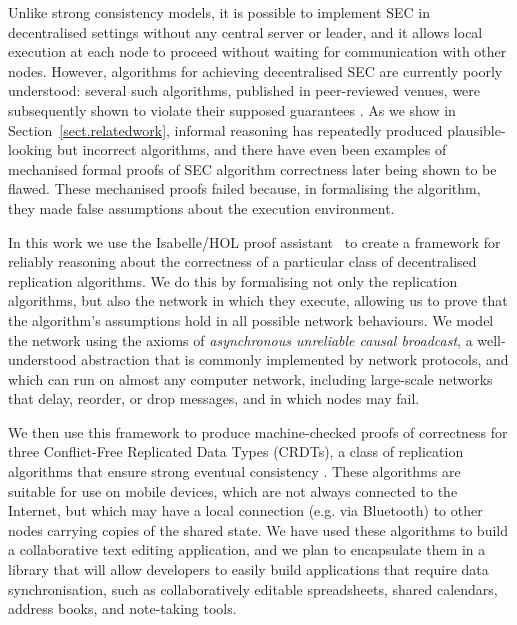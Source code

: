 \documentclass[acmlarge,review]{acmart}
\begin{document}
Unlike strong consistency models, it is possible to implement SEC in decentralised settings without any central server or leader, and it allows local execution at each node to proceed without waiting for communication with other nodes.
However, algorithms for achieving decentralised SEC are currently poorly understood: several such algorithms, published in peer-reviewed venues, were subsequently shown to violate their supposed guarantees \cite{Imine:2003ks,Imine:2006kn,Oster:2005vi}.
As we show in Section~\ref{sect.relatedwork}, informal reasoning has repeatedly produced plausible-looking but incorrect algorithms, and there have even been examples of mechanised formal proofs of SEC algorithm correctness later being shown to be flawed.
These mechanised proofs failed because, in formalising the algorithm, they made false assumptions about the execution environment.

In this work we use the Isabelle/HOL proof assistant~\cite{DBLP:conf/tphol/WenzelPN08} to create a framework for reliably reasoning about the correctness of a particular class of decentralised replication algorithms.
We do this by formalising not only the replication algorithms, but also the network in which they execute, allowing us to prove that the algorithm's assumptions hold in all possible network behaviours.
We model the network using the axioms of \emph{asynchronous unreliable causal broadcast}, a well-understood abstraction that is commonly implemented by network protocols, and which can run on almost any computer network, including large-scale networks that delay, reorder, or drop messages, and in which nodes may fail.

We then use this framework to produce machine-checked proofs of correctness for three Conflict-Free Replicated Data Types (CRDTs), a class of replication algorithms that ensure strong eventual consistency \cite{Shapiro:2011wy,Shapiro:2011un}.
These algorithms are suitable for use on mobile devices, which are not always connected to the Internet, but which may have a local connection (e.g. via Bluetooth) to other nodes carrying copies of the shared state.
We have used these algorithms to build a collaborative text editing application, and we plan to encapsulate them in a library that will allow developers to easily build applications that require data synchronisation, such as collaboratively editable spreadsheets, shared calendars, address books, and note-taking tools.
\end{document}
